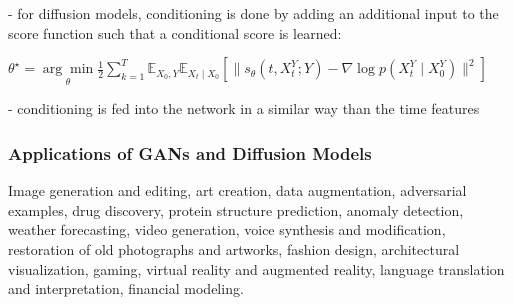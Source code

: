 - for diffusion models, conditioning is done by adding an additional input to the score function such that a conditional score is learned:

$\theta^{\star}=\underset{\theta}{\arg \min } \frac{1}{2} \sum_{k=1}^{T} \mathbb{E}_{X_{0}, Y} \mathbb{E}_{X_{t} \mid X_{0}}[\|s_{\theta}(t, X_{t}^{Y} ; Y)-\nabla \log p(X_{t}^{Y} \mid X_{0}^{Y})\|^{2}]$

- conditioning is fed into the network in a similar way than the time features

\subsubsection*{Applications of GANs and Diffusion Models}
Image generation and editing, art creation, data augmentation, adversarial examples, drug discovery, protein structure prediction, anomaly detection, weather forecasting, video generation, voice synthesis and modification, restoration of old photographs and artworks, fashion design, architectural visualization, gaming, virtual reality and augmented reality, language translation and interpretation, financial modeling.








